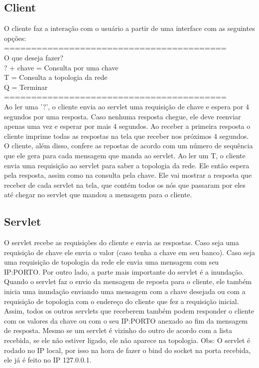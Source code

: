 \documentclass[10pt]{article}
\begin{document}
		\subsection{Client}
			O cliente faz a interação com o usuário a partir de uma interface com as seguintes opções:\\
	=========================================\\
	O que deseja fazer?\\
	?  + chave = Consulta por uma chave\\
	T          = Consulta a topologia da rede\\
	Q          = Terminar\\
	=========================================\\
			Ao ler uma '?', o cliente envia ao servlet uma requisição de chave e espera por 4 segundos por uma resposta. Caso nenhuma resposta chegue, ele deve reenviar apenas uma vez e esperar por mais 4 segundos. Ao receber a primeira resposta o cliente imprime todas as respostas na tela que receber nos próximos 4 segundos.
			O cliente, além disso, confere as repostas de acordo com um número de sequência que ele gera para cada mensagem que manda ao servlet.
			\newline Ao ler um T, o cliente envia uma requisição ao servlet para saber a topologia da rede. Ele então espera pela resposta, assim como na consulta pela chave. Ele vai mostrar a resposta que receber de cada servlet na tela, que contém todos os nós que passaram por eles até chegar no servlet que mandou a mensagem para o cliente.
		\subsection{Servlet}
			O servlet recebe as requisições do cliente e envia as respostas. Caso seja uma requisição de chave ele envia o valor (caso tenha a chave em seu banco). Caso seja uma requisição de topologia da rede ele envia uma mensagem com seu IP:PORTO.
			Por outro lado, a parte mais importante do servlet é a inundação. Quando o servlet faz o envio da mensagem de reposta para o cliente, ele também inicia uma inundação enviando uma mensagem com a chave desejada ou com a requisição de topologia com o endereço do cliente que fez a requisição inicial. Assim, todos os outros servlets que receberem também podem responder o cliente com os valores da chave ou com o seu IP:PORTO anexado ao fim da mensagem de resposta.
			\newline Mesmo se um servlet é vizinho do outro de acordo com a lista recebida, se ele não estiver ligado, ele não aparece na topologia.
			\newline Obs: O servlet é rodado no IP local, por isso na hora de fazer o bind do socket na porta recebida, ele já é feito no IP 127.0.0.1.
\end{document}
